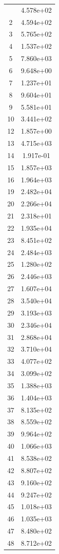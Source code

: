 \documentclass[12pt]{article}
\begin{document}
\begin{longtable}{@{}cc@{}}
\bottomrule
\endlastfoot
1 & 4.578e+02 \\
2 & 4.594e+02 \\
3 & 5.765e+02 \\
4 & 1.537e+02 \\
5 & 7.860e+03 \\
6 & 9.648e+00 \\
7 & 1.237e+01 \\
8 & 9.604e+01 \\
9 & 5.581e+01 \\
10 & 3.441e+02 \\
12 & 1.857e+00 \\
13 & 4.715e+03 \\
14 & 1.917e-01 \\
15 & 1.857e+03 \\
16 & 1.964e+03 \\
19 & 2.482e+04 \\
20 & 2.266e+04 \\
21 & 2.318e+01 \\
22 & 1.935e+04 \\
23 & 8.451e+02 \\
24 & 2.484e+03 \\
25 & 1.280e+02 \\
26 & 2.446e+03 \\
27 & 1.607e+04 \\
28 & 3.540e+04 \\
29 & 3.193e+03 \\
30 & 2.346e+04 \\
31 & 2.868e+04 \\
32 & 3.710e+04 \\
33 & 4.077e+02 \\
34 & 3.099e+02 \\
35 & 1.388e+03 \\
36 & 1.404e+03 \\
37 & 8.135e+02 \\
38 & 8.559e+02 \\
39 & 9.964e+02 \\
40 & 1.066e+03 \\
41 & 8.538e+02 \\
42 & 8.807e+02 \\
43 & 9.160e+02 \\
44 & 9.247e+02 \\
45 & 1.018e+03 \\
46 & 1.035e+03 \\
47 & 8.480e+02 \\
48 & 8.712e+02 \\

\end{longtable}
\end{document}
